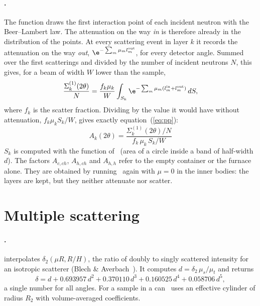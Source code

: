 \documentclass[11pt,a4paper]{report}
\begin{document}
\paragraph{\mcams.} The function  draws the first
interaction point of each incident neutron with the Beer--Lambert law. The
attenuation on the way \emph{in} is therefore already in the distribution of the
points. At every scattering event in layer $k$ it records the attenuation on the
way \emph{out}, $\e^{-\sum_m\mu_m l_m^{\text{out}}}$, for every detector angle.
Summed over the first scatterings and divided by the number of incident
neutrons $N$, this gives, for a beam of width $W$ lower than the sample,
\begin{equation}
  \frac{\Sigma_k^{(1)}(2\theta)}{N} = \frac{f_k\mu_k}{W}
  \int_{S_k}\e^{-\sum_m \mu_m(l^{\text{in}}_m+l^{\text{out}}_m)}\,dS ,
\end{equation}
where $f_k$ is the scatter fraction. Dividing by the value it would have without
attenuation, $f_k\mu_k S_k/W$, gives exactly equation~(\ref{eq:pp}):
\begin{equation}
  \boxed{A_k(2\theta) = \frac{\Sigma_k^{(1)}(2\theta)/N}{f_k\,\mu_k\,S_k/W}}
  \label{eq:mcA}
\end{equation}
$S_k$ is computed with the function  of \pyc\ (area of a circle
inside a band of half-width $d$). The factors $A_{c,ch}$, $A_{h,ch}$ and
$A_{h,h}$ refer to the empty container or the furnace alone. They are obtained
by running \mcams\ again with $\mu=0$ in the inner bodies: the layers are kept,
but they neither attenuate nor scatter.

\section{Multiple scattering}

\paragraph{\pyc.}  interpolates
$\delta_2(\mu R, R/H)$, the ratio of doubly to singly scattered intensity for an
isotropic scatterer (Blech \& Averbach~\cite{ba}). It computes
$d = \delta_2\,\mu_s/\mu_t$ and returns
\begin{equation}
  \delta = d + 0.693957\,d^2 + 0.370110\,d^3 + 0.160525\,d^4 + 0.058706\,d^5 ,
  \label{eq:series}
\end{equation}
a single number for all angles. For a sample in a can \cor\ uses an effective
cylinder of radius $R_2$ with volume-averaged coefficients.
\end{document}
